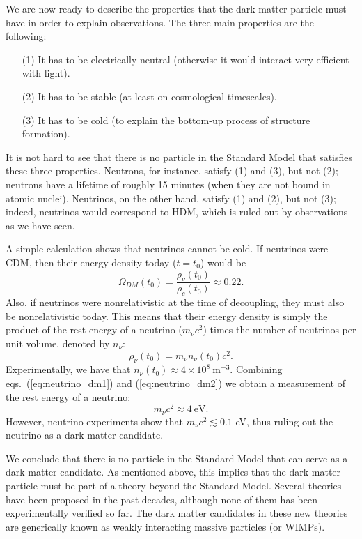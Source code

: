\documentclass[11pt, a4paper,oneside,openright]{book}
\numberwithin{equation}{section}
\begin{document}
We are now ready to describe the properties that the dark matter particle must have in order to explain observations. The three main properties are the following:
\begin{itemize}
\item [(1)] It has to be electrically neutral (otherwise it would interact very efficient with light).
\item [(2)] It has to be stable (at least on cosmological timescales).
\item [(3)] It has to be cold (to explain the bottom-up process of structure formation).
\end{itemize}
It is not hard to see that there is no particle in the Standard Model that satisfies these three properties. Neutrons, for instance, satisfy (1) and (3), but not (2); neutrons have a lifetime of roughly 15 minutes (when they are not bound in atomic nuclei). Neutrinos, on the other hand, satisfy (1) and (2), but not (3); indeed, neutrinos would correspond to HDM, which is ruled out by observations as we have seen.

A simple calculation shows that neutrinos cannot be cold. If neutrinos were CDM, then their energy density today ($t=t_0$) would be
\begin{equation} \label{eq:neutrino_dm1}
\Omega_{DM}(t_0)= \frac{\rho_{\nu}(t_0)}{\rho_c(t_0)} \approx 0.22.
\end{equation}
Also, if neutrinos were nonrelativistic at the time of decoupling, they must also be nonrelativistic today. This means that their energy density is simply the product of the rest energy of a neutrino ($m_{\nu}c^2$) times the number of neutrinos per unit volume, denoted by $n_{\nu}$:
\begin{equation} \label{eq:neutrino_dm2}
\rho_{\nu}(t_0)=m_{\nu}n_{\nu}(t_0)c^2.
\end{equation}
Experimentally, we have that $n_{\nu}(t_0)\approx 4\times10^8~\mathrm{m^{-3}}$. Combining eqs.\ (\ref{eq:neutrino_dm1}) and (\ref{eq:neutrino_dm2}) we obtain a measurement of the rest energy of a neutrino:
\begin{equation}
m_{\nu}c^2\approx 4~\mathrm{eV}.
\end{equation}
However, neutrino experiments show that $m_{\nu}c^2 \lesssim 0.1$ eV, thus ruling out the neutrino as a dark matter candidate.

We conclude that there is no particle in the Standard Model that can serve as a dark matter candidate. As mentioned above, this implies that the dark matter particle must be part of a theory beyond the Standard Model. Several theories have been proposed in the past decades, although none of them has been experimentally verified so far. The dark matter candidates in these new theories are generically known as weakly interacting massive particles (or WIMPs).
\end{document}
